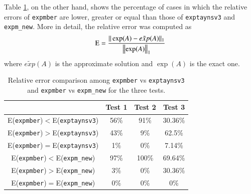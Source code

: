 \documentclass[preprint,10pt,numbers,sort&compress]{elsarticle}
\begin{document}

Table \ref{table_err_comparative}, on the other hand, shows the percentage of cases in which the relative errors of \texttt{expmber} are lower, greater or equal than those of \texttt{exptaynsv3} and \texttt{expm\_new}. More in detail, the relative error was computed as
$$
\textmd{E}=\frac{\| \exp(A)-\tilde {exp}(A)\|_1}{\left\Vert
\exp(A)\right\Vert_1}
$$where $\tilde {exp}(A)$ is the approximate solution and $\exp(A)$ is the exact one.    

\begin{table}[!t]\begin{center}
                \caption{Relative error comparison among  \texttt{expmber}
vs  \texttt{exptaynsv3} and  \texttt{expmber}
vs  \texttt{expm\_new} for the three tests.}
{\footnotesize

               \begin{tabular}{|c||c|c|c|}\hline & Test 1  &Test 2 & Test 3\\\hline
                        E(\texttt{expmber})$<$E(\texttt{exptaynsv3})     & 56\% &  91\% & 30.36\%\\\hline
                        E(\texttt{expmber})$>$E(\texttt{exptaynsv3})     & 43\% &   9\%  & 62.5\%\\\hline
                        E(\texttt{expmber})$=$E(\texttt{exptaynsv3})     &  1\%  &   0\%  & 7.14\%\\\hline
                        E(\texttt{expmber})$<$E(\texttt{expm\_new})    & 97\% & 100\% & 69.64\%\\\hline
                        E(\texttt{expmber})$>$E(\texttt{expm\_new})    &   3\% &    0\% & 30.36\%\\\hline
                        E(\texttt{expmber})$=$E(\texttt{expm\_new})    &   0\% &    0\% &       0\%\\\hline
                \end{tabular}
}
                \label{table_err_comparative}
        \end{center}
\end{table}
\end{document}
